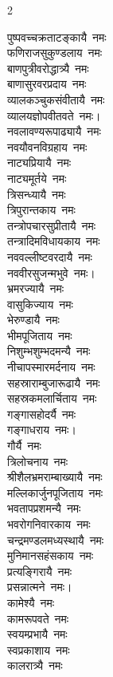 \begin{multicols}{2}
\begin{flushleft}
पुष्पवच्चक्रताटङ्कायै~नमः\\
फणिराजसुकुण्डलाय~नमः\\
बाणपुत्रीवरोद्धात्र्यै~नमः\\
बाणासुरवरप्रदाय~नमः\\
व्यालकञ्चुकसंवीतायै~नमः\\
व्यालयज्ञोपवीतवते~नमः।\hfill{}\\
नवलावण्यरूपाढ्यायै~नमः\\
नवयौवनविग्रहाय~नमः\\
नाट्यप्रियायै~नमः\\
नाट्यमूर्तये~नमः\\
त्रिसन्ध्यायै~नमः\\
त्रिपुरान्तकाय~नमः\\
तन्त्रोपचारसुप्रीतायै~नमः\\
तन्त्रादिमविधायकाय~नमः\\
नववल्लीष्टवरदायै~नमः\\
नववीरसुजन्मभुवे~नमः।\hfill{}\\
भ्रमरज्यायै~नमः\\
वासुकिज्याय~नमः\\
भेरुण्डायै~नमः\\
भीमपूजिताय~नमः\\
निशुम्भशुम्भदमन्यै~नमः\\
नीचापस्मारमर्दनाय~नमः\\
सहस्राराम्बुजारूढायै~नमः\\
सहस्रकमलार्चिताय~नमः\\
गङ्गासहोदर्यै~नमः\\
गङ्गाधराय~नमः।\hfill{}\\
गौर्यै~नमः\\
त्रिलोचनाय~नमः\\
श्रीशैलभ्रमराम्बाख्यायै~नमः\\
मल्लिकार्जुनपूजिताय~नमः\\
भवतापप्रशमन्यै~नमः\\
भवरोगनिवारकाय~नमः\\
चन्द्रमण्डलमध्यस्थायै~नमः\\
मुनिमानसहंसकाय~नमः\\
प्रत्यङ्गिरायै~नमः\\
प्रसन्नात्मने~नमः।\hfill{}\\
कामेश्यै~नमः\\
कामरूपवते~नमः\\
स्वयम्प्रभायै~नमः\\
स्वप्रकाशाय~नमः\\
कालरात्र्यै~नमः\\

\end{flushleft}
\end{multicols}
